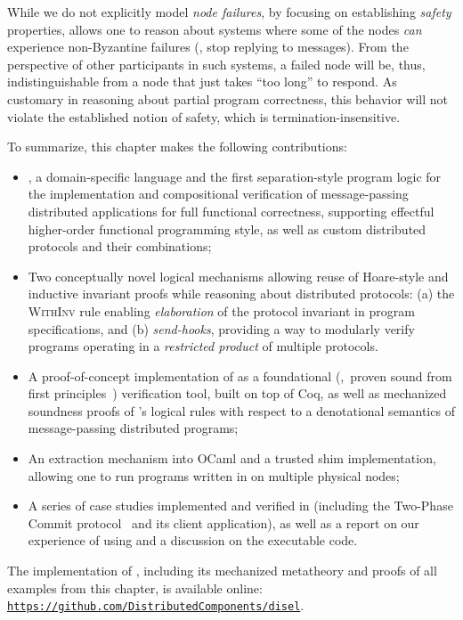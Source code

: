 While we do not explicitly model \emph{node failures}, by focusing on
establishing \emph{safety} properties, \disel allows one to reason
about systems where some of the nodes \emph{can} experience
non-Byzantine failures (\ie, stop replying to messages).
%
From the perspective of other participants in such systems, a failed
node will be, thus, indistinguishable from a node that just takes
``too long'' to respond. As customary in reasoning about partial
program correctness, this behavior will not violate the established
notion of safety, which is termination-insensitive.

To summarize, this chapter makes the following contributions:

\begin{itemize}
\item \disel, a domain-specific language and the first
  separation-style program logic for the implementation and
  compositional verification of message-passing distributed
  applications for full functional correctness, supporting effectful
  higher-order functional programming style, as well as custom
  distributed protocols and their combinations;

\item Two conceptually novel logical mechanisms allowing reuse of
  Hoare-style and inductive invariant proofs while reasoning about
  distributed protocols: (a) the \textsc{WithInv} rule enabling
  \emph{elaboration} of the protocol invariant in program
  specifications, and (b) \emph{send-hooks}, providing a way to
  modularly verify programs operating in a \emph{restricted product}
  of multiple protocols.

\item A proof-of-concept implementation of \disel as a foundational
  (\ie,~proven sound from first principles~\cite{Appel:LICS01})
  verification tool, built on top of Coq, as well as mechanized soundness
  proofs of \disel's logical rules with respect to a denotational
  semantics of message-passing distributed programs;

\item An extraction mechanism into OCaml and a trusted shim
  implementation, allowing one to run programs written in \disel on
  multiple physical nodes;

\item A series of case studies implemented and verified in \disel
  (including the Two-Phase Commit protocol~\cite{Weikum-Vossen:TIS02}
  and its client application), as well as a report on our experience
  of using \disel and a discussion on the executable code.

\end{itemize}
%
The implementation of \disel, including its mechanized metatheory and
proofs of all examples from this chapter, is available online:
{\small{\href{https://github.com/DistributedComponents/disel}{\texttt{https://github.com/DistributedComponents/disel}}}}.

